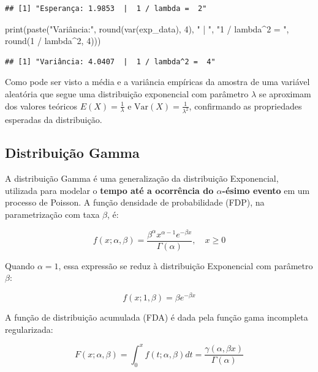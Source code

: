 \documentclass[
]{article}
\newenvironment{Shaded}{\begin{snugshade}}{\end{snugshade}}
\newcommand{\DecValTok}[1]{\textcolor[rgb]{0.00,0.00,0.81}{#1}}
\newcommand{\FunctionTok}[1]{\textcolor[rgb]{0.00,0.00,0.00}{#1}}
\newcommand{\NormalTok}[1]{#1}
\newcommand{\SpecialCharTok}[1]{\textcolor[rgb]{0.00,0.00,0.00}{#1}}
\newcommand{\StringTok}[1]{\textcolor[rgb]{0.31,0.60,0.02}{#1}}
\begin{document}
\begin{verbatim}
## [1] "Esperança: 1.9853  |  1 / lambda =  2"
\end{verbatim}

\begin{Shaded}
\begin{Highlighting}[]
\FunctionTok{print}\NormalTok{(}\FunctionTok{paste}\NormalTok{(}\StringTok{"Variância:"}\NormalTok{, }\FunctionTok{round}\NormalTok{(}\FunctionTok{var}\NormalTok{(exp\_data), }\DecValTok{4}\NormalTok{), }\StringTok{" | "}\NormalTok{, }\StringTok{"1 / lambda\^{}2 = "}\NormalTok{, }\FunctionTok{round}\NormalTok{(}\DecValTok{1} \SpecialCharTok{/}\NormalTok{ lambda}\SpecialCharTok{\^{}}\DecValTok{2}\NormalTok{, }\DecValTok{4}\NormalTok{)))}
\end{Highlighting}
\end{Shaded}

\begin{verbatim}
## [1] "Variância: 4.0407  |  1 / lambda^2 =  4"
\end{verbatim}

Como pode ser visto a média e a variância empíricas da amostra de uma variável aleatória que segue uma distribuição exponencial com parâmetro \(\lambda\) se aproximam dos valores teóricos \(E(X) = \frac{1}{\lambda}\) e \(\text{Var}(X) = \frac{1}{\lambda^2}\), confirmando as propriedades esperadas da distribuição.

\hypertarget{distribuiuxe7uxe3o-gamma}{%
\subsection{Distribuição Gamma}\label{distribuiuxe7uxe3o-gamma}}

A distribuição Gamma é uma generalização da distribuição Exponencial, utilizada para modelar o \textbf{tempo até a ocorrência do \(\alpha\)-ésimo evento} em um processo de Poisson. A função densidade de probabilidade (FDP), na parametrização com taxa \(\beta\), é:

\[
f(x; \alpha, \beta) = \frac{\beta^\alpha x^{\alpha - 1} e^{-\beta x}}{\Gamma(\alpha)}, \quad x \geq 0
\]

Quando \(\alpha = 1\), essa expressão se reduz à distribuição Exponencial com parâmetro \(\beta\):

\[
f(x; 1, \beta) = \beta e^{-\beta x}
\]

A função de distribuição acumulada (FDA) é dada pela função gama incompleta regularizada:

\[
F(x; \alpha, \beta) = \int_0^x f(t; \alpha, \beta) dt = \frac{\gamma(\alpha, \beta x)}{\Gamma(\alpha)}
\]
\end{document}
